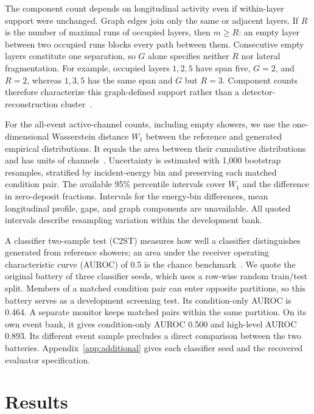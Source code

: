 \documentclass[11pt]{article}
\begin{document}
The component count depends on longitudinal activity even if within-layer support were unchanged. Graph edges join only the same or adjacent layers. If $R$ is the number of maximal runs of occupied layers, then $m\geq R$: an empty layer between two occupied runs blocks every path between them. Consecutive empty layers constitute one separation, so $G$ alone specifies neither $R$ nor lateral fragmentation. For example, occupied layers $1,2,5$ have span five, $G=2$, and $R=2$, whereas $1,3,5$ has the same span and $G$ but $R=3$. Component counts therefore characterize this graph-defined support rather than a detector-reconstruction cluster~\cite{atlastopocluster}.

For the all-event active-channel counts, including empty showers, we use the one-dimensional Wasserstein distance $W_1$ between the reference and generated empirical distributions. It equals the area between their cumulative distributions and has units of channels~\cite{kansalmetrics}. Uncertainty is estimated with 1,000 bootstrap resamples, stratified by incident-energy bin and preserving each matched condition pair. The available 95\% percentile intervals cover $W_1$ and the difference in zero-deposit fractions. Intervals for the energy-bin differences, mean longitudinal profile, gaps, and graph components are unavailable. All quoted intervals describe resampling variation within the development bank.

A classifier two-sample test (C2ST) measures how well a classifier distinguishes generated from reference showers; an area under the receiver operating characteristic curve (AUROC) of 0.5 is the chance benchmark~\cite{c2st,kansalmetrics}. We quote the original battery of three classifier seeds, which uses a row-wise random train/test split. Members of a matched condition pair can enter opposite partitions, so this battery serves as a development screening test. Its condition-only AUROC is 0.464. A separate monitor keeps matched pairs within the same partition. On its own event bank, it gives condition-only AUROC 0.500 and high-level AUROC 0.893. Its different event sample precludes a direct comparison between the two batteries. Appendix~\ref{app:additional} gives each classifier seed and the recovered evaluator specification.

\section{Results}
\label{sec:results}
\end{document}
